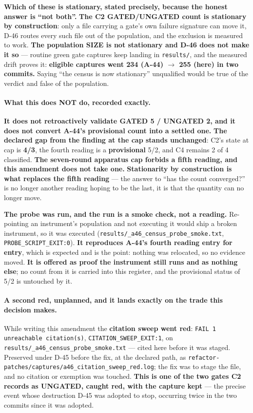 \documentclass[
  10pt,
]{article}
\begin{document}
\textbf{Which of these is stationary, stated precisely, because the honest answer is ``not both''.} \textbf{The C2 GATED/UNGATED count is stationary by construction}: only a file carrying a gate's own failure signature can move it, D-46 routes every such file out of the population, and the exclusion is measured to work. \textbf{The population SIZE is not stationary and D-46 does not make it so} --- routine green gate captures keep landing in \texttt{results/}, and the measured drift proves it: \textbf{eligible captures went 234 (A-44) $\rightarrow$ 255 (here) in two commits.} Saying ``the census is now stationary'' unqualified would be true of the verdict and false of the population.

\paragraph{What this does NOT do, recorded exactly.}
\textbf{It does not retroactively validate GATED 5 / UNGATED 2, and it does not convert A-44's provisional count into a settled one.} \textbf{The declared gap from the finding at the cap stands unchanged}: C2's state at cap is \textbf{4/3}, the fourth reading is a \textbf{provisional} 5/2, and C4 remains 2 of 4 classified. \textbf{The seven-round apparatus cap forbids a fifth reading, and this amendment does not take one.} \textbf{Stationarity by construction is what replaces the fifth reading} --- the answer to ``has the count converged?'' is no longer another reading hoping to be the last, it is that the quantity can no longer move.

\textbf{The probe was run, and the run is a smoke check, not a reading.} Re-pointing an instrument's population and not executing it would ship a broken instrument, so it was executed (\texttt{results/\allowbreak{}\_a46\_census\_probe\_smoke.txt}, \texttt{PROBE\_SCRIPT\_EXIT:0}). \textbf{It reproduces A-44's fourth reading entry for entry}, which is expected and is the point: nothing was relocated, so no evidence moved. \textbf{It is offered as proof the instrument still runs and as nothing else}; no count from it is carried into this register, and the provisional status of 5/2 is untouched by it.

\paragraph{A second red, unplanned, and it lands exactly on the trade this decision makes.}
While writing this amendment the \textbf{citation sweep went red}: \texttt{FAIL 1 unreachable citation(s)}, \texttt{CITATION\_SWEEP\_EXIT:1}, on \texttt{results/\allowbreak{}\_a46\_census\_probe\_smoke.txt} --- cited here before it was staged. Preserved under D-45 before the fix, at the declared path, as \texttt{refactor-patches/\allowbreak{}captures/\allowbreak{}a46\_citation\_sweep\_red.log}; the fix was to stage the file, and no citation or exemption was touched. \textbf{This is one of the two gates C2 records as UNGATED, caught red, with the capture kept} --- the precise event whose destruction D-45 was adopted to stop, occurring twice in the two commits since it was adopted.
\end{document}
